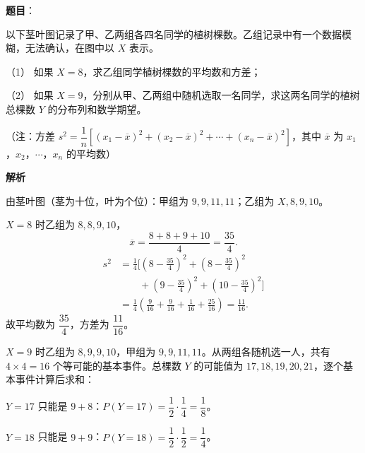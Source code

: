 \begin{answer}



\end{answer}
\begin{answer}

\textbf{题目}：

以下茎叶图记录了甲、乙两组各四名同学的植树棵数。乙组记录中有一个数据模糊，无法确认，在图中以 $X$ 表示。
\nopagebreak[4]
\begin{center}\end{center}
\nopagebreak[4]
（1） 如果 $X=8$，求乙组同学植树棵数的平均数和方差；

（2） 如果 $X=9$，分别从甲、乙两组中随机选取一名同学，求这两名同学的植树总棵数 $Y$ 的分布列和数学期望。

（注：方差 $s^2=\dfrac1n\left[(x_1-\overline x)^2+(x_2-\overline x)^2+\cdots+(x_n-\overline x)^2\right]$，其中 $\overline x$ 为 $x_1$，$x_2$，$\cdots$，$x_n$ 的平均数）

\textbf{解析}

由茎叶图（茎为十位，叶为个位）：甲组为 $9,9,11,11$；乙组为 $X,8,9,10$。


$X=8$ 时乙组为 $8,8,9,10$，
\nopagebreak[4]
\[
\overline x=\frac{8+8+9+10}{4}=\frac{35}{4}.
\]
\nopagebreak[4]
\[
\begin{aligned}
s^2&=\frac14\Big[\left(8-\frac{35}{4}\right)^2+\left(8-\frac{35}{4}\right)^2\\
&\qquad+\left(9-\frac{35}{4}\right)^2+\left(10-\frac{35}{4}\right)^2\Big]\\
&=\frac14\left(\frac{9}{16}+\frac{9}{16}+\frac{1}{16}+\frac{25}{16}\right)
=\frac{11}{16}.
\end{aligned}
\]
故平均数为 $\dfrac{35}{4}$，方差为 $\dfrac{11}{16}$。


$X=9$ 时乙组为 $8,9,9,10$，甲组为 $9,9,11,11$。从两组各随机选一人，共有 $4\times4=16$ 个等可能的基本事件。总棵数 $Y$ 的可能值为 $17,18,19,20,21$，逐个基本事件计算后求和：

$Y=17$ 只能是 $9+8$：$P(Y=17)=\dfrac12\cdot\dfrac14=\dfrac18$。

$Y=18$ 只能是 $9+9$：$P(Y=18)=\dfrac12\cdot\dfrac12=\dfrac14$。


\end{answer}

